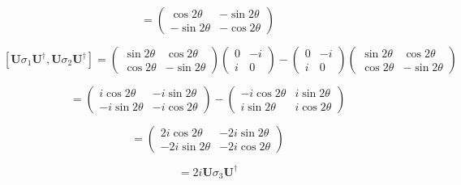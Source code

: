 \documentclass[12pt]{article}
\begin{document}
\[
    =
    \begin{pmatrix}
        \cos 2 \theta  & -\sin 2 \theta \\
        -\sin 2 \theta & -\cos 2 \theta
    \end{pmatrix}
\]

\[
    \left[\mathbf{U}\sigma_1\mathbf{U^\dagger}, \mathbf{U}\sigma_2\mathbf{U^\dagger}\right] =
    \begin{pmatrix}
        \sin 2\theta  & \cos 2 \theta \\
        \cos 2 \theta & -\sin 2\theta
    \end{pmatrix}
    \begin{pmatrix}
        0 & -i \\
        i & 0
    \end{pmatrix}
    -
    \begin{pmatrix}
        0 & -i \\
        i & 0
    \end{pmatrix}
    \begin{pmatrix}
        \sin 2\theta  & \cos 2 \theta \\
        \cos 2 \theta & -\sin 2\theta
    \end{pmatrix}
\]

\[
    =
    \begin{pmatrix}
        i\cos 2\theta  & -i\sin 2\theta \\
        -i\sin 2\theta & -i\cos 2\theta
    \end{pmatrix}
    -
    \begin{pmatrix}
        -i\cos 2\theta & i\sin 2\theta \\
        i\sin 2\theta  & i\cos 2\theta
    \end{pmatrix}
\]

\[
    =
    \begin{pmatrix}
        2i\cos 2\theta  & -2i\sin 2\theta \\
        -2i\sin 2\theta & -2i\cos 2\theta
    \end{pmatrix}
\]

\[
    = 2i\mathbf{U}\sigma_3\mathbf{U^\dagger}
\]

\newpage


\nocite{El-Deeb_PEU-356_Assignments}
\end{document}
